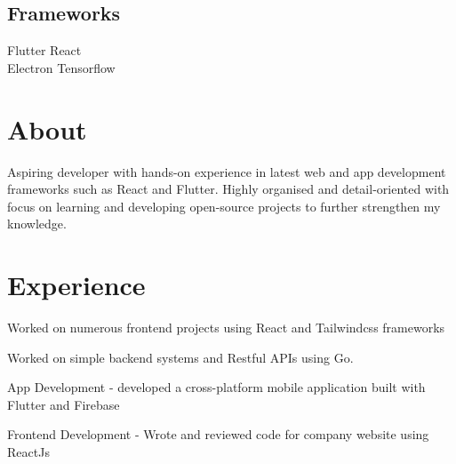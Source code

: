 \documentclass[]{dev-cv}
\begin{document}
\begin{minipage}[t]{0.33\textwidth}
\subsection{Frameworks}
Flutter \textbullet{} React \\
Electron \textbullet{} Tensorflow   \\
\sectionsep


%
%

\end{minipage} 
\hfill
\begin{minipage}[t]{0.66\textwidth} 

\section{About}
\vspace{\topsep}
Aspiring developer with hands-on experience in latest web and app development frameworks such as React and Flutter. Highly organised and detail-oriented with focus on learning and developing open-source projects to further strengthen my knowledge.
\sectionsep

\section{Experience}
\vspace{\topsep}
\vspace{\topsep}
\begin{tightemize}
\item Worked on numerous frontend projects using React and Tailwindcss frameworks
\item Worked on simple backend systems and Restful APIs using Go.
\end{tightemize}
\sectionsep

\vspace{\topsep}
\begin{tightemize}
\item App Development - developed a cross-platform mobile application built with Flutter and Firebase 
\item Frontend Development - Wrote and reviewed code for company website using ReactJs
\end{tightemize}
\sectionsep


\end{minipage}
\end{document}
